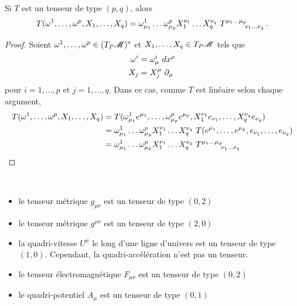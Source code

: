 \documentclass[a4paper,11pt]{report}
\begin{document}
                \begin{prop}\begin{leftbar}
                    Si $T$ est un tenseur de type $(p,q)$, alors
                    \begin{equation}
                        T(\omega^1,\dots,\omega^p,X_1,\dots,X_q) = \omega^1_{\mu_1}\dots\omega^p_{\mu_p}X^{\nu_1}_1\dots X^{\nu_q}_q~ T\indices{^{\mu_1\dots\mu_p}_{\nu_1\dots\nu_q}}.
                    \end{equation}
                \end{leftbar}\end{prop}
                
                \begin{proof}
                    Soient $\omega^1,\dots,\omega^p\in(T_P\mathscr{M})^*$ et $X_1,\dots,X_q\in T_P\mathscr{M}$ tels que 
                    \begin{align}
                        \omega^i &= \omega^i_\mu ~dx^\mu \\
                        X_j &= X^\mu_j~\partial_\mu
                    \end{align}
                    pour $i=1,\dots,p$ et $j=1,\dots,q$. Dans ce cas, comme $T$ est linéaire selon chaque argument,
                    \begin{align}
                        T(\omega^1,\dots,\omega^p,X_1,\dots,X_q) &= T(\omega^1_{\mu_1}e^{\mu_1},\dots,\omega^p_{\mu_p}e^{\mu_p},X^{\nu_1}_1e_{\nu_1},\dots,X^{\nu_q}_qe_{\nu_q}) \\
                        &=\omega^1_{\mu_1}\dots\omega^p_{\mu_p}X^{\nu_1}_1\dots X^{\nu_q}_q~T(e^{\mu_1},\dots,e^{\mu_p},e_{\nu_1},\dots,e_{\nu_q}) \\
                        &= \omega^1_{\mu_1}\dots\omega^p_{\mu_p}X^{\nu_1}_1\dots X^{\nu_q}_q~ T\indices{^{\mu_1\dots\mu_p}_{\nu_1\dots\nu_q}}
                    \end{align}
                \end{proof}
                
                \begin{exmp}${}$
                    \begin{itemize}[label = \textbullet]
                        \item le tenseur métrique $g_{\mu\nu}$ est un tenseur de type $(0,2)$
                        \item le tenseur métrique $g^{\mu\nu}$ est un tenseur de type $(2,0)$
                        \item la quadri-vitesse $U^{\mu}$ le long d'une ligne d'univers est un tenseur de type $(1,0)$. Cependant, la quadri-accélération n'est pas un tenseur.
                        \item le tenseur électromagnétique $F_{\mu\nu}$ est un tenseur de type $(0,2)$
                        \item le quadri-potentiel $A_{\mu}$ est un tenseur de type $(0,1)$
                    \end{itemize}
                \end{exmp}
                
\end{document}
